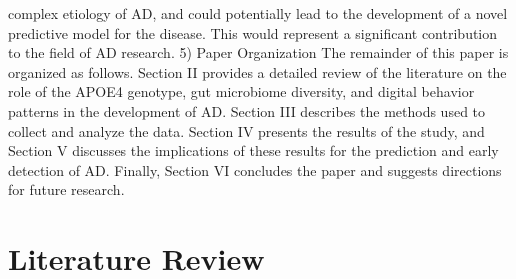 \documentclass[conference]{IEEEtran}
\begin{document}
complex etiology of AD, and could potentially lead to the development of a novel predictive model for the disease. This would represent a significant contribution to the field of AD research. 5) Paper Organization The remainder of this paper is organized as follows. Section II provides a detailed review of the literature on the role of the APOE4 genotype, gut microbiome diversity, and digital behavior patterns in the development of AD. Section III describes the methods used to collect and analyze the data. Section IV presents the results of the study, and Section V discusses the implications of these results for the prediction and early detection of AD. Finally, Section VI concludes the paper and suggests directions for future research.

\section{Literature Review}
\end{document}
